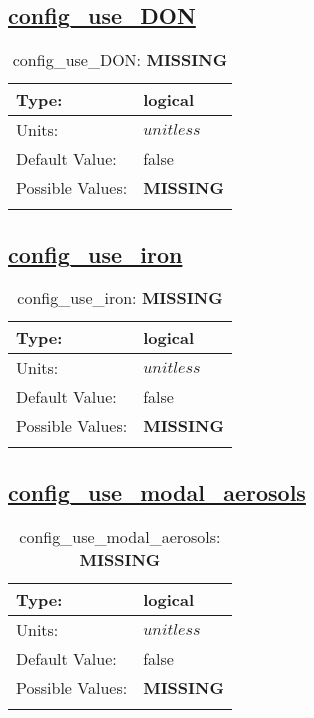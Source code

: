 \subsection[config\_use\_DON]{\hyperref[sec:nm_tab_biogeochemistry]{config\_use\_DON}}
\label{subsec:nm_sec_config_use_DON}
\begin{center}
\begin{longtable}{| p{2.0in} || p{4.0in} |}
    \hline
    Type: & logical \\
    \hline
    Units: & $unitless$ \\
    \hline
    Default Value: & false \\
    \hline
    Possible Values: & {\bf \color{red} MISSING} \\
    \hline
    \caption{config\_use\_DON: {\bf \color{red} MISSING}}
\end{longtable}
\end{center}
\subsection[config\_use\_iron]{\hyperref[sec:nm_tab_biogeochemistry]{config\_use\_iron}}
\label{subsec:nm_sec_config_use_iron}
\begin{center}
\begin{longtable}{| p{2.0in} || p{4.0in} |}
    \hline
    Type: & logical \\
    \hline
    Units: & $unitless$ \\
    \hline
    Default Value: & false \\
    \hline
    Possible Values: & {\bf \color{red} MISSING} \\
    \hline
    \caption{config\_use\_iron: {\bf \color{red} MISSING}}
\end{longtable}
\end{center}
\subsection[config\_use\_modal\_aerosols]{\hyperref[sec:nm_tab_biogeochemistry]{config\_use\_modal\_aerosols}}
\label{subsec:nm_sec_config_use_modal_aerosols}
\begin{center}
\begin{longtable}{| p{2.0in} || p{4.0in} |}
    \hline
    Type: & logical \\
    \hline
    Units: & $unitless$ \\
    \hline
    Default Value: & false \\
    \hline
    Possible Values: & {\bf \color{red} MISSING} \\
    \hline
    \caption{config\_use\_modal\_aerosols: {\bf \color{red} MISSING}}
\end{longtable}
\end{center}
